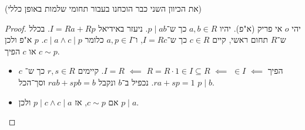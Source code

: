 \documentclass[name=רשימות אלגברה לינארית 2א]{../../../tex/classes/megasumPreamble}
\begin{document}
	(את הכיוון השני כבר הוכחנו בעבור תחומי שלמות באופן כללי)
	\begin{proof}
		יהי $o$ אי פריק (א"פ). יהיו $a, b \in R$ כך ש־$p \mid ab$. ניעזר באידיאל $I = Ra + Rp$. 
		בכלל ש־$R$ תחום ראשי, קיים $c \in R$ כך ש־$I = Rc$, ו־$a, p \in I$ כלומר $c \mid a \land c \mid p$. $p$ א"פ ולכן $c \sim p$ או $c$ הפיך. 
		\begin{itemize}
			\item $c$ הפיך $\impliedby$ $ \in I$ $\impliedby$ $R = R \cdot 1 \in I \subseteq R$ $\impliedby$ $I = R$. קיימים $r, s \in R$ כך ש־$ra + sp = 1$. נכפיל ב־$b$ ונקבל $rab + spb = b$ וסך־הכל $p \mid b$. 
			\item אם $c \sim p$, אז $p \mid c \land c \mid a$ ולכן $p \mid a$. 
		\end{itemize}\envendproof
	\end{proof}
	
	
		
	
\end{document}
